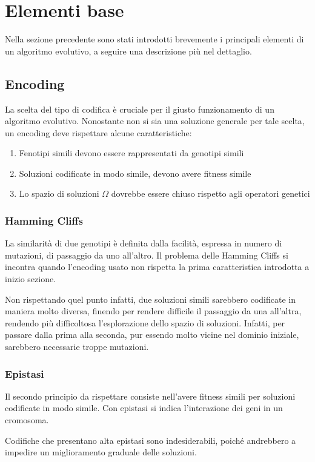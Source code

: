 \documentclass[a4paper]{article}
\begin{document}
\newpage

\section{Elementi base}
Nella sezione precedente sono stati introdotti brevemente i principali elementi 
di un algoritmo evolutivo, a seguire una descrizione più nel dettaglio.

\subsection{Encoding}
La scelta del tipo di codifica è cruciale per il giusto funzionamento
di un algoritmo evolutivo.
Nonostante non si sia una soluzione generale per tale scelta, un encoding deve rispettare 
alcune caratteristiche:
\begin{enumerate}
    \item Fenotipi simili devono essere rappresentati da genotipi simili
    \item Soluzioni codificate in modo simile, devono avere fitness simile
    \item Lo spazio di soluzioni $\Omega$ dovrebbe essere chiuso rispetto agli operatori genetici
\end{enumerate}
\subsubsection{Hamming Cliffs}
La similarità di due genotipi è definita dalla facilità, espressa in numero 
di mutazioni, di passaggio da uno all'altro. 
Il problema delle Hamming Cliffs si incontra quando l'encoding usato non rispetta 
la prima caratteristica introdotta a inizio sezione.

Non rispettando quel punto infatti, due soluzioni simili sarebbero codificate in maniera
molto diversa, finendo per rendere difficile il passaggio da una all'altra, rendendo più difficoltosa 
l'esplorazione dello spazio di soluzioni. Infatti, per passare dalla prima alla seconda, 
pur essendo molto vicine nel dominio iniziale, sarebbero necessarie troppe mutazioni.
\subsubsection{Epistasi}
Il secondo principio da rispettare consiste nell'avere fitness simili per soluzioni 
codificate in modo simile.
Con epistasi si indica l'interazione dei geni in un cromosoma.

Codifiche che presentano alta epistasi sono indesiderabili, poiché andrebbero a 
impedire un miglioramento graduale delle soluzioni.
\end{document}
